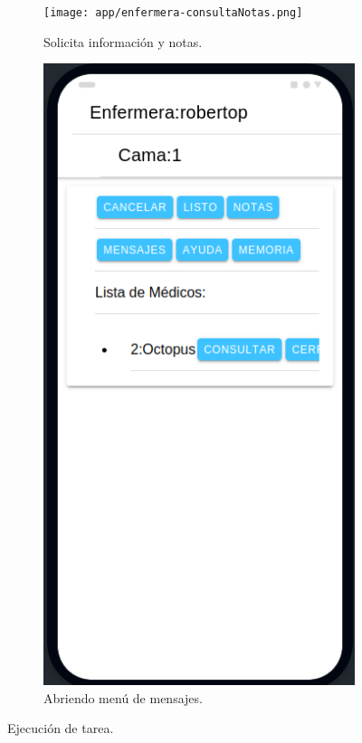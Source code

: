 \begin{figure}[!htpb]
\begin{subfigure}[b]{0.3\textwidth}
     \end{subfigure}
     \hfill
     \begin{subfigure}[b]{0.3\textwidth}
         \centering
         \texttt{[image: app/enfermera-consultaNotas.png]}
         \caption{Solicita información y notas.}
         \label{fig_3:2de3}
     \end{subfigure}
     \hfill
     \begin{subfigure}[b]{0.3\textwidth}
         \centering
         \includegraphics[width=.95\textwidth]{./Figures/app/enfermera-msg.png}
         \caption{Abriendo menú de mensajes.}
         \label{fig_3:3de3}
     \end{subfigure}
        \caption{Ejecución de tarea.}
        \label{fig_3:Ejecución de tarea}
\end{figure}
